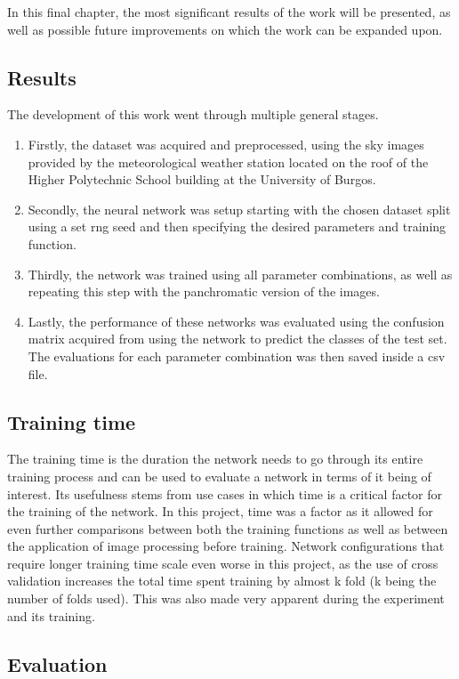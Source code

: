 In this final chapter, the most significant results of the work will be presented, as well as possible future improvements on which the work can be expanded upon.
\subsection{Results}
The development of this work went through multiple general stages.
\begin{enumerate}
    \item Firstly, the dataset was acquired and preprocessed, using the sky images provided by the meteorological weather station located on the roof of the Higher Polytechnic School building at the University of Burgos.
    \item Secondly, the neural network was setup starting with the chosen dataset split using a set rng seed and then specifying the desired parameters and training function.
    \item Thirdly, the network was trained using all parameter combinations, as well as repeating this step with the panchromatic version of the images.
    \item Lastly, the performance of these networks was evaluated using the confusion matrix acquired from using the network to predict the classes of the test set. The evaluations for each parameter combination was then saved inside a csv file.
\end{enumerate}

\subsection{Training time}
The training time is the duration the network needs to go through its entire training process and can be used to evaluate a network in terms of it being of interest. Its usefulness stems from use cases in which time is a critical factor for the training of the network.
In this project, time was a factor as it allowed for even further comparisons between both the training functions as well as between the application of image processing before training. Network configurations that require longer training time scale even worse in this project, as the use of cross validation increases the total time spent training by almost k fold (k being the number of folds used). This was also made very apparent during the experiment and its training.

\subsection{Evaluation}


